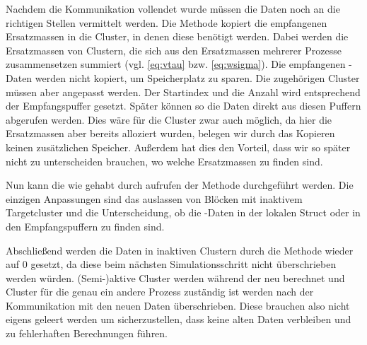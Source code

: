     Nachdem die Kommunikation vollendet wurde müssen die Daten noch an die richtigen Stellen vermittelt werden. Die Methode  kopiert die empfangenen Ersatzmassen in die 
    Cluster, in denen diese benötigt werden. Dabei werden die Ersatzmassen von Clustern, die sich aus den Ersatzmassen mehrerer Prozesse zusammensetzen summiert (vgl. \autoref{eq:vtau} bzw. 
    \autoref{eq:wsigma}). Die empfangenen -Daten werden nicht kopiert, um Speicherplatz zu sparen. Die zugehörigen Cluster müssen aber angepasst werden. Der Startindex und die 
    Anzahl wird entsprechend der Empfangspuffer gesetzt. Später können so die Daten direkt aus diesen Puffern abgerufen werden. Dies wäre für die Cluster zwar auch möglich, da hier die Ersatzmassen
    aber bereits alloziert wurden, belegen wir durch das Kopieren keinen zusätzlichen Speicher. Außerdem hat dies den Vorteil, dass wir so später nicht zu unterscheiden brauchen, wo welche Ersatzmassen
    zu finden sind.
    
    Nun kann die \koppl wie gehabt durch aufrufen der Methode  durchgeführt werden. Die einzigen Anpassungen sind das auslassen von Blöcken mit inaktivem Targetcluster und die 
    Unterscheidung, ob die -Daten in der lokalen  Struct oder in den Empfangspuffern zu finden sind.
    
    Abschließend werden die Daten in inaktiven Clustern durch die Methode  wieder auf $0$ gesetzt, da diese beim nächsten Simulationsschritt nicht überschrieben
    werden würden. (Semi-)aktive Cluster werden während der \vorw neu berechnet und Cluster für die genau ein andere Prozess zuständig ist werden nach der Kommunikation mit den neuen Daten überschrieben.
    Diese brauchen also nicht eigens geleert werden um sicherzustellen, dass keine alten Daten verbleiben und zu fehlerhaften Berechnungen führen.
    